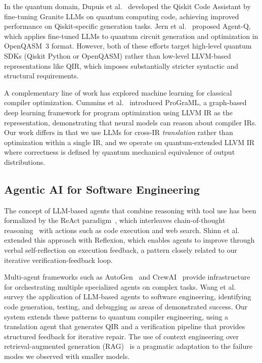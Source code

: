\documentclass[conference]{IEEEtran}
\begin{document}
In the quantum domain, Dupuis et al.~\cite{dupuis2024qiskitassistant} developed the Qiskit Code Assistant by fine-tuning Granite LLMs on quantum computing code, achieving improved performance on Qiskit-specific generation tasks. Jern et al.~\cite{jern2025agentq} proposed Agent-Q, which applies fine-tuned LLMs to quantum circuit generation and optimization in OpenQASM~3 format. However, both of these efforts target high-level quantum SDKs (Qiskit Python or OpenQASM) rather than low-level LLVM-based representations like QIR, which imposes substantially stricter syntactic and structural requirements.

A complementary line of work has explored machine learning for classical compiler optimization. Cummins et al.~\cite{cummins2020programl} introduced ProGraML, a graph-based deep learning framework for program optimization using LLVM IR as the representation, demonstrating that neural models can reason about compiler IRs. Our work differs in that we use LLMs for cross-IR \emph{translation} rather than optimization within a single IR, and we operate on quantum-extended LLVM IR where correctness is defined by quantum mechanical equivalence of output distributions.

\subsection{Agentic AI for Software Engineering}

The concept of LLM-based agents that combine reasoning with tool use has been formalized by the ReAct paradigm~\cite{yao2023react}, which interleaves chain-of-thought reasoning~\cite{wei2022chainofthought} with actions such as code execution and web search. Shinn et al.~\cite{shinn2023reflexion} extended this approach with Reflexion, which enables agents to improve through verbal self-reflection on execution feedback, a pattern closely related to our iterative verification-feedback loop.

Multi-agent frameworks such as AutoGen~\cite{wu2023autogen} and CrewAI~\cite{hong2024crewai} provide infrastructure for orchestrating multiple specialized agents on complex tasks. Wang et al.~\cite{wang2024agentsurvey} survey the application of LLM-based agents to software engineering, identifying code generation, testing, and debugging as areas of demonstrated success. Our system extends these patterns to quantum compiler engineering, using a translation agent that generates QIR and a verification pipeline that provides structured feedback for iterative repair. The use of context engineering over retrieval-augmented generation (RAG)~\cite{lewis2020rag} is a pragmatic adaptation to the failure modes we observed with smaller models.
\end{document}
